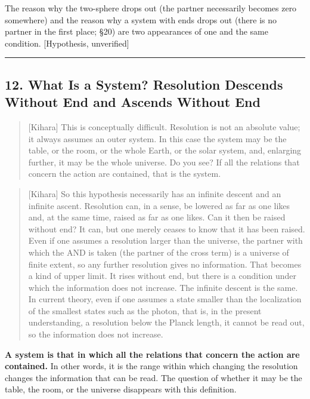 \documentclass[
  a4paper,
]{article}
\begin{document}
The reason why the two-sphere drops out (the partner necessarily becomes
zero somewhere) and the reason why a system with ends drops out (there
is no partner in the first place; §20) are two appearances of one and
the same condition. {[}Hypothesis, unverified{]}

\begin{center}\rule{0.5\linewidth}{0.5pt}\end{center}

\subsection{12. What Is a System? Resolution Descends Without End and
Ascends Without
End}\label{what-is-a-system-resolution-descends-without-end-and-ascends-without-end}

\begin{quote}
{[}Kihara{]} This is conceptually difficult. Resolution is not an
absolute value; it always assumes an outer system. In this case the
system may be the table, or the room, or the whole Earth, or the solar
system, and, enlarging further, it may be the whole universe. Do you
see? If all the relations that concern the action are contained, that is
the system.
\end{quote}

\begin{quote}
{[}Kihara{]} So this hypothesis necessarily has an infinite descent and
an infinite ascent. Resolution can, in a sense, be lowered as far as one
likes and, at the same time, raised as far as one likes. Can it then be
raised without end? It can, but one merely ceases to know that it has
been raised. Even if one assumes a resolution larger than the universe,
the partner with which the AND is taken (the partner of the cross term)
is a universe of finite extent, so any further resolution gives no
information. That becomes a kind of upper limit. It rises without end,
but there is a condition under which the information does not increase.
The infinite descent is the same. In current theory, even if one assumes
a state smaller than the localization of the smallest states such as the
photon, that is, in the present understanding, a resolution below the
Planck length, it cannot be read out, so the information does not
increase.
\end{quote}

\textbf{A system is that in which all the relations that concern the
action are contained.} In other words, it is the range within which
changing the resolution changes the information that can be read. The
question of whether it may be the table, the room, or the universe
disappears with this definition.
\end{document}
